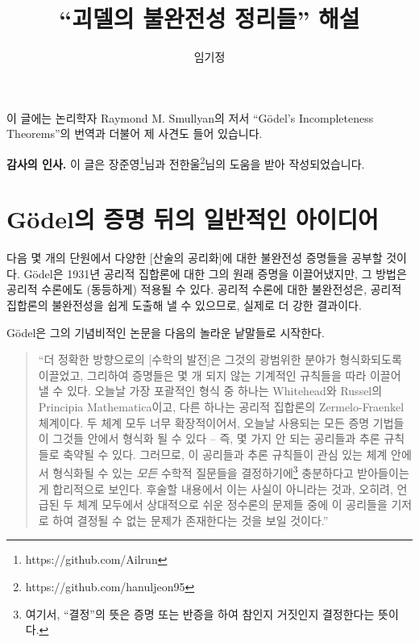 \documentclass[12pt]{paper}
\title{``괴델의 불완전성 정리들'' 해설}
\author{임기정}
\begin{document}
  \maketitle

  이 글에는 논리학자 Raymond M. Smullyan의 저서 ``G\"odel's Incompleteness Theorems''의 번역과 더불어 제 사견도 들어 있습니다.

  \textbf{감사의 인사.} 이 글은 장준영\footnote{https://github.com/Ailrun}님과 전한울\footnote{https://github.com/hanuljeon95}님의 도움을 받아 작성되었습니다.

  \newpage

  \section{G\"odel의 증명 뒤의 일반적인 아이디어}
  \hspace{12pt}

  다음 몇 개의 단원에서 다양한 [산술의 공리화]에 대한 불완전성 증명들을 공부할 것이다.
  G\"odel은 1931년 공리적 집합론에 대한 그의 원래 증명을 이끌어냈지만,
  그 방법은 공리적 수론에도 (동등하게) 적용될 수 있다.
  공리적 수론에 대한 불완전성은,
  공리적 집합론의 불완전성을 쉽게 도출해 낼 수 있으므로,
  실제로 더 강한 결과이다.
  
  G\"odel은 그의 기념비적인 논문을 다음의 놀라운 낱말들로 시작한다.

  \begin{quotation}
    ``더 정확한 방향으로의 [수학의 발전]은 그것의 광범위한 분야가 형식화되도록 이끌었고,
    그리하여 증명들은 몇 개 되지 않는 기계적인 규칙들을 따라 이끌어 낼 수 있다.
    오늘날 가장 포괄적인 형식 중 하나는 Whitehead와 Russel의 Principia Mathematica이고,
    다른 하나는 공리적 집합론의 Zermelo-Fraenkel 체계이다.
    두 체계 모두 너무 확장적이어서,
    오늘날 사용되는 모든 증명 기법들이 그것들 안에서 형식화 될 수 있다 --
    즉, 몇 가지 안 되는 공리들과 추론 규칙들로 축약될 수 있다.
    그러므로, 이 공리들과 추론 규칙들이 관심 있는 체계 안에서 형식화될 수 있는 \textit{모든} 수학적 질문들을 결정하기에\footnote
    {
      여기서, ``결정''의 뜻은 증명 또는 반증을 하여 참인지 거짓인지 결정한다는 뜻이다.
    }
    충분하다고 받아들이는 게 합리적으로 보인다.
    후술할 내용에서 이는 사실이 아니라는 것과,
    오히려, 언급된 두 체계 모두에서 상대적으로 쉬운 정수론의 문제들 중에 이 공리들을 기저로 하여 결정될 수 없는 문제가 존재한다는 것을 보일 것이다.''
  \end{quotation}
\end{document}
